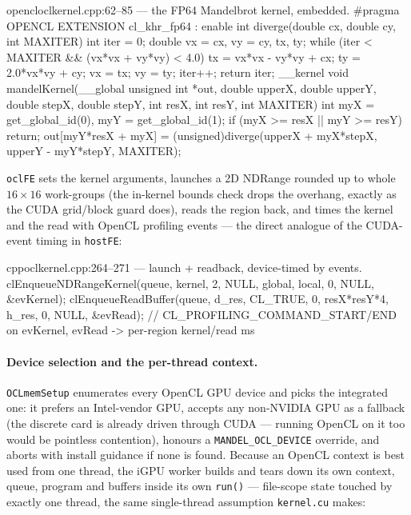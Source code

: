 \documentclass[
	english,
	letterpaper, oneside
]{article}
\begin{document}
\begin{sourcecode}{opencl}{oclkernel.cpp:62--85 --- the FP64 Mandelbrot kernel, embedded.}
#pragma OPENCL EXTENSION cl_khr_fp64 : enable
int diverge(double cx, double cy, int MAXITER) {
  int iter = 0; double vx = cx, vy = cy, tx, ty;
  while (iter < MAXITER && (vx*vx + vy*vy) < 4.0) {
    tx = vx*vx - vy*vy + cx;  ty = 2.0*vx*vy + cy;  vx = tx; vy = ty; iter++;
  }
  return iter;
}
__kernel void mandelKernel(__global unsigned int *out, double upperX, double upperY,
                           double stepX, double stepY, int resX, int resY, int MAXITER) {
  int myX = get_global_id(0), myY = get_global_id(1);
  if (myX >= resX || myY >= resY) return;
  out[myY*resX + myX] = (unsigned)diverge(upperX + myX*stepX, upperY - myY*stepY, MAXITER);
}
\end{sourcecode}

\texttt{oclFE} sets the kernel arguments, launches a 2D NDRange rounded up to
whole $16\times16$ work-groups (the in-kernel bounds check drops the overhang,
exactly as the CUDA grid/block guard does), reads the region back, and times the
kernel and the read with OpenCL profiling events --- the direct analogue of the
CUDA-event timing in \texttt{hostFE}:

\begin{sourcecode}{cpp}{oclkernel.cpp:264--271 --- launch + readback, device-timed by events.}
clEnqueueNDRangeKernel(queue, kernel, 2, NULL, global, local, 0, NULL, &evKernel);
clEnqueueReadBuffer(queue, d_res, CL_TRUE, 0, resX*resY*4, h_res, 0, NULL, &evRead);
// CL_PROFILING_COMMAND_START/END on evKernel, evRead -> per-region kernel/read ms
\end{sourcecode}

\paragraph{Device selection and the per-thread context.} \texttt{OCLmemSetup}
enumerates every OpenCL GPU device and picks the integrated one: it prefers
an Intel-vendor GPU, accepts any non-NVIDIA GPU as a fallback (the discrete card
is already driven through CUDA --- running OpenCL on it too would be pointless
contention), honours a \texttt{MANDEL\_OCL\_DEVICE} override, and aborts with
install guidance if none is found. Because an OpenCL context is best used from one
thread, the iGPU worker builds and tears down its own context, queue, program and
buffers inside its own \texttt{run()} --- file-scope state touched by
exactly one thread, the same single-thread assumption \texttt{kernel.cu} makes:
\end{document}
